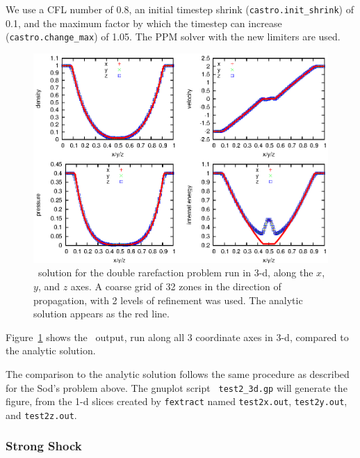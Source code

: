 We use a CFL number of 0.8, an initial
timestep shrink ({\tt castro.init\_shrink}) of 0.1, and the maximum factor by which
the timestep can increase ({\tt castro.change\_max}) of 1.05.  The PPM
solver with the new limiters are used.
\begin{figure}[h]
\centering
\includegraphics[width=5.0in]{CastroVerification/test2_3d}
\caption{\label{fig:test2} \castro\ solution for the double rarefaction
  problem run in 3-d, along the $x$, $y$, and $z$ axes.  A coarse grid
  of 32 zones in the direction of propagation, with 2 levels of
  refinement was used.  The analytic solution appears as the red
  line.}
\end{figure}

Figure~\ref{fig:test2} shows the \castro\ output, run along all 3
coordinate axes in 3-d, compared to the analytic solution.  

The comparison to the analytic solution follows the same procedure as
described for the Sod's problem above.  The gnuplot script {\tt
  test2\_3d.gp} will generate the figure, from the 1-d slices created by
{\tt fextract} named {\tt test2x.out}, {\tt test2y.out}, and {\tt test2z.out}.

\subsubsection{Strong Shock}

